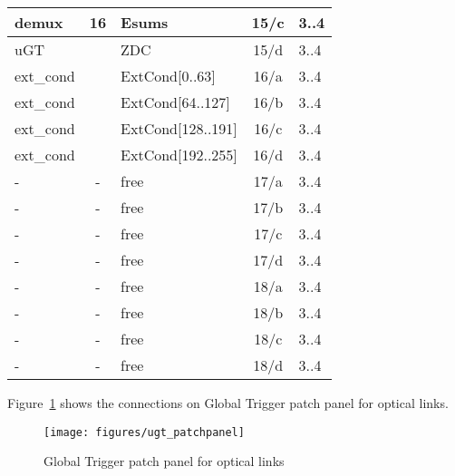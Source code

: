 \begin{longtable}{|l|c|l|c|l|}
demux & 16  & Esums      & 15/c & 3..4 \\\hline
uGT &    & ZDC      & 15/d & 3..4 \\\hline
ext\_cond &     & ExtCond[0..63]    & 16/a & 3..4 \\\hline
ext\_cond &     & ExtCond[64..127]  & 16/b & 3..4 \\\hline
ext\_cond &     & ExtCond[128..191] & 16/c & 3..4 \\\hline
ext\_cond &     & ExtCond[192..255] & 16/d & 3..4 \\\hline
- & - & free & 17/a & 3..4 \\\hline
- & - & free & 17/b & 3..4 \\\hline
- & - & free & 17/c & 3..4 \\\hline
- & - & free & 17/d & 3..4 \\\hline
- & - & free & 18/a & 3..4 \\\hline
- & - & free & 18/b & 3..4 \\\hline
- & - & free & 18/c & 3..4 \\\hline
- & - & free & 18/d & 3..4 \\\hline
\end{longtable}

Figure~\ref{fig:app:ugt_pp} shows the connections on Global Trigger patch panel for optical links.

\begin{figure}[htb]
\centering
\texttt{[image: figures/ugt\_patchpanel]}
\caption{Global Trigger patch panel for optical links}
\label{fig:app:ugt_pp}
\end{figure}

\clearpage


